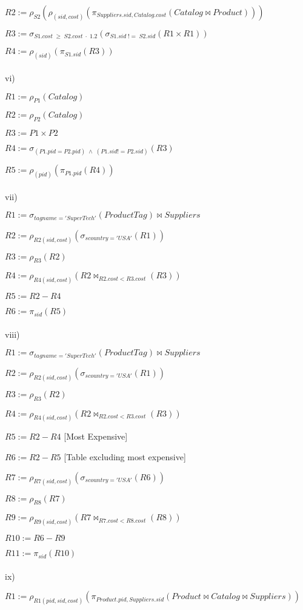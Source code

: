 \documentclass[10pt]{article}
\begin{document}
$R2 := \rho_{S2}(\rho_{(sid, cost)}(\pi_{Suppliers.sid, Catalog.cost}(Catalog \bowtie Product)))$

$R3 := \sigma_{S1.cost\;\geq\; S2.cost \; \cdot \;1.2 }(\sigma_{S1.sid\;!= \;S2.sid}(R1 \times R1))$

$R4 := \rho_{(sid)}(\pi_{S1.sid}(R3))$
\\~\\
vi)

$R1 := \rho_{P1}(Catalog)$

$R2 := \rho_{P2}(Catalog)$

$R3 := P1 \times P2$

$R4 := \sigma_{(P1.pid = P2.pid)\; \wedge\; (P1.sid != P2.sid)}(R3)$

$R5 := \rho_{(pid)}(\pi_{P1.pid}(R4))$
\\~\\
vii)

$R1 := \sigma_{tagname='Super Tech'}(ProductTag) \bowtie Suppliers$

$R2 := \rho_{R2(sid, cost)}(\sigma_{scountry = 'USA'}(R1))$

$R3 := \rho_{R3}(R2)$

$R4 := \rho_{R4(sid, cost)}(R2 \bowtie_{R2.cost < R3.cost}(R3))$

$R5 := R2 - R4$

$R6 := \pi_{sid}(R5)$
\\~\\
viii)

$R1 := \sigma_{tagname='Super Tech'}(ProductTag) \bowtie Suppliers$

$R2 := \rho_{R2(sid, cost)}(\sigma_{scountry = 'USA'}(R1))$

$R3 := \rho_{R3}(R2)$

$R4 := \rho_{R4(sid, cost)}(R2 \bowtie_{R2.cost < R3.cost}(R3))$

$R5 := R2 - R4$ [Most Expensive]

$R6 := R2 - R5$ [Table excluding most expensive]

$R7 := \rho_{R7(sid, cost)}(\sigma_{scountry = 'USA'}(R6))$

$R8 := \rho_{R8}(R7)$

$R9 := \rho_{R9(sid, cost)}(R7 \bowtie_{R7.cost < R8.cost}(R8))$

$R10 := R6 - R9$

$R11 := \pi_{sid}(R10)$
\\~\\
ix)

$R1 := \rho_{R1(pid, sid, cost)}(\pi_{Product.pid, Suppliers.sid}(Product \bowtie Catalog \bowtie Suppliers))$
\end{document}
